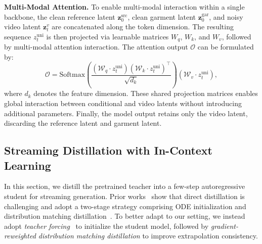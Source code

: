 \noindent
\textbf{Multi-Modal Attention.}
% 
To enable multi-modal interaction within a single backbone, the clean reference latent $\mathbf{z}^{\text{src}}_{0}$, clean garment latent $\mathbf{z}^{\text{gar}}_{0}$, and noisy video latent $\mathbf{z}^{v}_{t}$ are concatenated along the token dimension. The resulting sequence $z_t^{\text{uni}}$ is then projected via learnable matrices $W_q$, $W_k$, and $W_v$, followed by multi-modal attention interaction. The attention output $\mathcal{O}$ can be formulated by:
% 
\begin{equation}
    \mathcal{O} = \text{Softmax}(\frac{(\mathcal{W}_q \cdot z_t^{\text{uni}} )(\mathcal{W}_k \cdot z_t^{\text{uni}})^\top}{\sqrt{d_k}})(\mathcal{W}_v \cdot z_t^{\text{uni}}),
\end{equation}
% 
where $d_k$ denotes the feature dimension.
% 
These shared projection matrices enables global interaction between conditional and video latents without introducing additional parameters.
% 
Finally, the model output retains only the video latent, discarding the reference latent and garment latent.





\subsection{Streaming Distillation with In-Context Learning}
\label{sec:3-2}
%
In this section, we distill the pretrained teacher into a few-step autoregressive student for streaming generation.
% 
Prior works~\cite{yin2025slow,huang2025self,zhu2026causal} show that direct distillation is challenging and adopt a two-stage strategy comprising ODE initialization and distribution matching distillation~\cite{yin2024improved}.
% 
To better adapt to our setting, we instead adopt \textit{teacher forcing}~\cite{gao2024ca2,hu2024acdit,zhang2025test} to initialize the student model, followed by \textit{gradient-reweighted distribution matching distillation} to improve extrapolation consistency.



